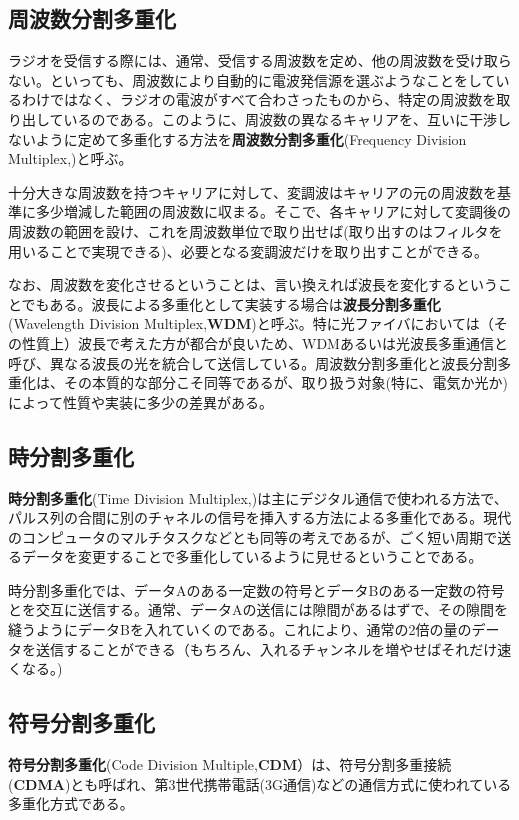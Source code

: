 \subsection{周波数分割多重化}
ラジオを受信する際には、通常、受信する周波数を定め、他の周波数を受け取らない。といっても、周波数により自動的に電波発信源を選ぶようなことをしているわけではなく、ラジオの電波がすべて合わさったものから、特定の周波数を取り出しているのである。このように、周波数の異なるキャリアを、互いに干渉しないように定めて多重化する方法を\textbf{周波数分割多重化}(Frequency Division Multiplex,)と呼ぶ。

十分大きな周波数を持つキャリアに対して、変調波はキャリアの元の周波数を基準に多少増減した範囲の周波数に収まる。そこで、各キャリアに対して変調後の周波数の範囲を設け、これを周波数単位で取り出せば(取り出すのはフィルタを用いることで実現できる)、必要となる変調波だけを取り出すことができる。

なお、周波数を変化させるということは、言い換えれば波長を変化するということでもある。波長による多重化として実装する場合は\textbf{波長分割多重化}(Wavelength Division Multiplex,\textbf{WDM})と呼ぶ。特に光ファイバにおいては（その性質上）波長で考えた方が都合が良いため、WDMあるいは光波長多重通信と呼び、異なる波長の光を統合して送信している。周波数分割多重化と波長分割多重化は、その本質的な部分こそ同等であるが、取り扱う対象(特に、電気か光か)によって性質や実装に多少の差異がある。

\subsection{時分割多重化}
\textbf{時分割多重化}(Time Division Multiplex,)は主にデジタル通信で使われる方法で、パルス列の合間に別のチャネルの信号を挿入する方法による多重化である。現代のコンピュータのマルチタスクなどとも同等の考えであるが、ごく短い周期で送るデータを変更することで多重化しているように見せるということである。

時分割多重化では、データAのある一定数の符号とデータBのある一定数の符号とを交互に送信する。通常、データAの送信には隙間があるはずで、その隙間を縫うようにデータBを入れていくのである。これにより、通常の2倍の量のデータを送信することができる（もちろん、入れるチャンネルを増やせばそれだけ速くなる。)

\subsection{符号分割多重化}
\textbf{符号分割多重化}(Code Division Multiple,\textbf{CDM}）は、符号分割多重接続(\textbf{CDMA})とも呼ばれ、第3世代携帯電話(3G通信)などの通信方式に使われている多重化方式である。

